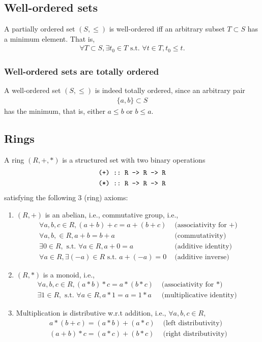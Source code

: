 \documentclass[11pt]{book}
\begin{document}
\subsection{Well-ordered sets}
A partially ordered set $(S, \leq)$ is well-ordered iff an arbitrary subset $T \subset S$ has a minimum element.
That is,
\begin{eqnarray}
\forall T \subset S, \exists t_0 \in T \text{ s.t. } \forall t \in T, t_0 \leq t.
\end{eqnarray}

\subsubsection{Well-ordered sets are totally ordered}
A well-ordered set $(S, \leq)$ is indeed totally ordered, since an arbitrary pair
\begin{eqnarray}
\{a, b\} \subset S
\end{eqnarray}
has the minimum, that is, either $a \leq b$ or $b \leq a$.

\subsection{Rings}
A ring $(R,+,*)$ is a structured set with two binary operations
\begin{eqnarray}
\verb|(+) :: R -> R -> R|\\
\verb|(*) :: R -> R -> R|
\end{eqnarray}
satisfying the following 3 (ring) axioms:
\begin{enumerate}
\item $(R,+)$ is an abelian, i.e., commutative group,
i.e.,
\begin{eqnarray}
\forall a,b,c \in R, (a+b) + c = a + (b + c) & \text{ (associativity for $+$)} \\
\forall a, b, \in R, a+b = b+a & \text{ (commutativity)} \\
\exists 0 \in R, \text{ s.t. } \forall a \in R, a + 0 = a & \text{ (additive identity) } \\
\forall a \in R, \exists (-a) \in R \text{ s.t. } a + (-a) = 0 & \text{ (additive inverse)}
\end{eqnarray}

\item $(R,*)$ is a monoid, i.e.,
\begin{eqnarray}
\forall a,b,c \in R, (a*b) * c = a * (b * c) & \text{ (associativity for $*$)} \\
\exists 1 \in R, \text{ s.t. } \forall a \in R, a * 1 = a = 1*a & \text{ (multiplicative identity) } 
\end{eqnarray}

\item Multiplication is distributive w.r.t addition, i.e., $\forall a,b,c \in R$, 
\begin{eqnarray}
a*(b+c) = (a*b) + (a*c) & \text{ (left distributivity)} \\
(a+b)*c = (a*c) + (b*c) & \text{ (right distributivity)} 
\end{eqnarray}

\end{enumerate}
\end{document}
